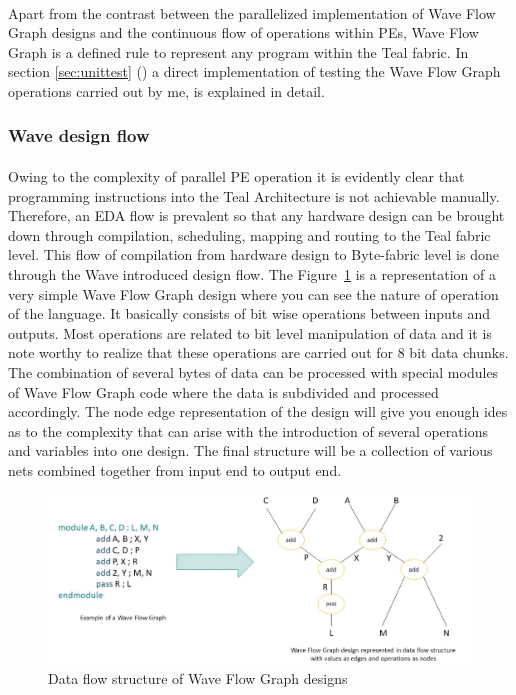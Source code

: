 \paragraph{}
Apart from the contrast between the parallelized implementation of Wave Flow Graph designs and the continuous flow of operations within PEs, Wave Flow Graph is a defined rule to represent any program within the Teal fabric. In section \ref{sec:unittest} () a direct implementation of testing the Wave Flow Graph operations carried out by me, is explained in detail.

\subsubsection{Wave design flow}
\paragraph{}
Owing to the complexity of parallel PE operation it is evidently clear that programming instructions into the Teal Architecture is not achievable manually. Therefore, an EDA flow is prevalent so that any hardware design can be brought down through compilation, scheduling, mapping and routing to the Teal fabric level. This flow of compilation from hardware design to Byte-fabric level is done through the Wave introduced design flow. The Figure~\ref{Fig:wfgstruct} is a representation of a very simple Wave Flow Graph design where you can see the nature of operation of the language. It basically consists of bit wise operations between inputs and outputs. Most operations are related to bit level manipulation of data and it is note worthy to realize that these operations are carried out for 8 bit data chunks. The combination of several bytes of data can be processed with special modules of Wave Flow Graph code where the data is subdivided and processed accordingly. The node edge representation of the design will give you enough ides as to the complexity that can arise with the introduction of several operations and variables into one design. The final structure will be a collection of various nets combined together from input end to output end.

\begin{figure}[h]
    \centering
    \includegraphics[trim=0cm 0cm 0cm 0cm, clip=true,scale=0.5]{figures/wfg_struct.jpg}
    \caption{Data flow structure of Wave Flow Graph designs\label{Fig:wfgstruct}}\vspace{-4mm}
    \end{figure}

\pagebreak